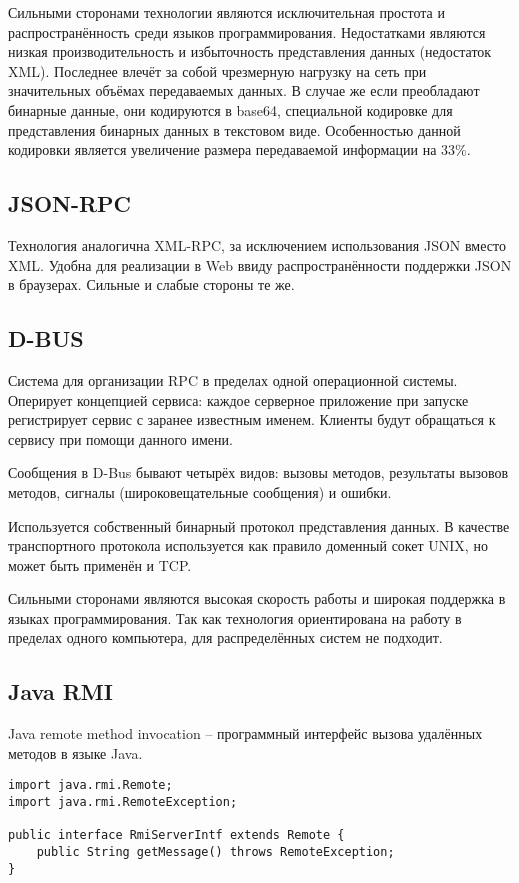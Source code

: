 Сильными сторонами технологии являются исключительная простота
и распространённость среди языков программирования. Недостатками являются
низкая производительность и избыточность представления данных (недостаток XML).
Последнее влечёт за собой чрезмерную нагрузку на сеть при значительных объёмах
передаваемых данных. В случае же если преобладают бинарные данные,
они кодируются в base64, специальной кодировке для представления бинарных
данных в текстовом виде. Особенностью данной кодировки является увеличение
размера передаваемой информации на 33\%.

\subsection{JSON-RPC}
Технология аналогична XML-RPC, за исключением использования JSON вместо XML.
Удобна для реализации в Web ввиду распространённости поддержки JSON
в браузерах. Сильные и слабые стороны те же.

\subsection{D-BUS}
Система для организации RPC в пределах одной операционной системы.
Оперирует концепцией сервиса: каждое серверное приложение при запуске
регистрирует сервис с заранее известным именем. Клиенты будут обращаться
к сервису при помощи данного имени.

Сообщения в D-Bus бывают четырёх видов: вызовы методов, результаты вызовов методов, сигналы (широковещательные сообщения) и ошибки.

Используется собственный бинарный протокол представления данных.
В качестве транспортного протокола используется как правило доменный сокет UNIX,
но может быть применён и TCP.

Сильными сторонами являются высокая скорость работы и широкая поддержка
в языках программирования. Так как технология ориентирована на работу
в пределах одного компьютера, для распределённых систем не подходит.

\subsection{Java RMI}
Java remote method invocation -- программный интерфейс вызова удалённых методов
в языке Java.
\begin{verbatim}
import java.rmi.Remote;
import java.rmi.RemoteException;

public interface RmiServerIntf extends Remote {
    public String getMessage() throws RemoteException;
}
\end{verbatim}

